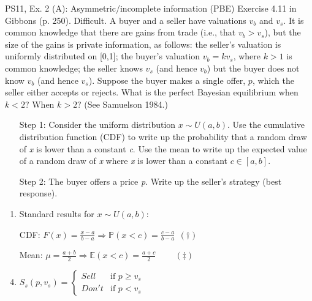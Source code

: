 \begin{frame}{PS11, Ex. 2 (A): Asymmetric/incomplete information (PBE)}
    Exercise 4.11 in Gibbons (p. 250). Difficult. A buyer and a seller have valuations $v_b$ and $v_s$. It is common knowledge that there are gains from trade (i.e., that $v_b > v_s$), but the size of the gains is private information, as follows: the seller’s valuation is uniformly distributed on [0,1]; the buyer’s valuation $v_b = kv_s$, where $k > 1$ is common knowledge; the seller knows $v_s$ (and hence $v_b$) but the buyer does not know $v_b$ (and hence $v_s$). Suppose the buyer makes a single offer, $p$, which the seller either accepts or rejects. What is the perfect Bayesian equilibrium when $k < 2$? When $k > 2$? (See Samuelson 1984.) \vspace{-8pt}
    \begin{multicols}{2}
      \begin{itemize}
        \item[Step 1:] Consider the uniform distribution $x\sim U(a, b)$. Use the cumulative distribution function (CDF) to write up the probability that a random draw of \textit{x} is lower than a constant \textit{c}. Use the mean to write up the expected value of a random draw of \textit{x} where \textit{x} is lower than a constant $c\in[a,b]$.
        \item[Step 2:] The buyer offers a price \textit{p}. Write up the seller's strategy (best response).
      \end{itemize}
      \vfill\null\columnbreak
      \begin{enumerate}
        \item Standard results for $x\sim U(a, b):$
        \item[CDF:] $F(x)=\frac{x-a}{b-a}\Rightarrow\mathbb{P}(x<c)=\frac{c-a}{b-a}\ \ (\dagger)$
        \item[Mean:] $\mu=\frac{a+b}{2}\Rightarrow\mathbb{E}(x<c)=\frac{a+c}{2}\quad\quad\ (\ddagger)$
        \item $S_s(p,v_s)=\left\{\begin{array}{ll}
          Sell  & \text{if }p\geq v_s \\
          Don't & \text{if }p < v_s
        \end{array}\right.$
      \end{enumerate}
      \vfill\null
    \end{multicols}
\end{frame}
